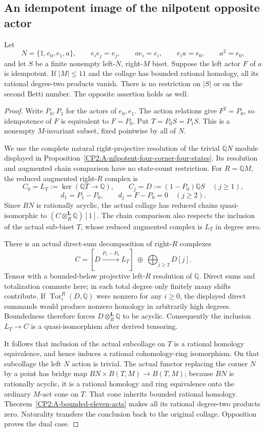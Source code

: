 \subsection{An idempotent image of the nilpotent opposite actor}

\begin{proposition}[Proved]
\label{CP2:A-nilpotent-four-idempotent-action}
Let
\[
 N=\{1,e_0,e_1,a\},\qquad
 e_i e_j=e_j,\qquad ae_i=e_i,\qquad e_i a=e_0,\qquad a^2=e_0,
\]
and let $S$ be a finite nonempty left-$N$, right-$M$ biset.  Suppose
the left actor $F$ of $a$ is idempotent.  If $|M|\leq11$ and the
collage has bounded rational homology, all its rational degree-two
products vanish.  There is no restriction on $|S|$ or on the second
Betti number.  The opposite assertion holds as well.
\end{proposition}
\begin{proof}
Write $P_0,P_1$ for the actors of $e_0,e_1$.  The action relations
give $F^2=P_0$, so idempotence of $F$ is equivalent to $F=P_0$.
Put $T=P_0S=P_1S$.  This is a nonempty $M$-invariant subset, fixed
pointwise by all of $N$.

We use the complete natural right-projective resolution of the
trivial $\mathbb QN$ module displayed in
Proposition~\ref{CP2:A-nilpotent-four-corner-four-states}.  Its
resolution and augmented chain comparison have no state-count
restriction.  For $R=\mathbb QM$, the reduced augmented right-$R$
complex is
\[
 C_0=L_T:=\ker(\mathbb QT\to\mathbb Q),\qquad
 C_j=D:=(1-P_0)\mathbb QS\quad(j\geq1),
\]
\[
 d_1=P_1-P_0,\qquad d_j=F-P_0=0\quad(j\geq2).
\]
Since $BN$ is rationally acyclic, the actual collage has reduced
chains quasi-isomorphic to
$(C\otimes_R^{\mathbf L}\mathbb Q)[1]$.  The chain comparison
also respects the inclusion of the actual sub-biset $T$, whose
reduced augmented complex is $L_T$ in degree zero.

There is an actual direct-sum decomposition of right-$R$ complexes
\[
 C=[D\xrightarrow{P_1-P_0}L_T]
       \ \oplus\ \bigoplus_{j\geq2}D[j].
\]
Tensor with a bounded-below projective left-$R$ resolution of
$\mathbb Q$.  Direct sums and totalization commute here; in each
total degree only finitely many shifts contribute.  If
$\operatorname{Tor}^R_i(D,\mathbb Q)$ were nonzero for any $i\geq0$,
the displayed direct summands would produce nonzero homology in
arbitrarily high degrees.  Boundedness therefore forces
$D\otimes_R^{\mathbf L}\mathbb Q$ to be acyclic.  Consequently
the inclusion $L_T\to C$ is a quasi-isomorphism after derived
tensoring.

It follows that inclusion of the actual subcollage on $T$ is a
rational homology equivalence, and hence induces a rational
cohomology-ring isomorphism.  On that subcollage the left $N$
action is trivial.  The actual functor replacing the corner $N$
by a point has bridge map
$BN\times B(T,M)\to B(T,M)$; because $BN$ is rationally acyclic,
it is a rational homology and ring equivalence onto the ordinary
$M$-act cone on $T$.  That cone inherits bounded rational homology.
Theorem~\ref{CP2:A-bounded-eleven-acts} makes all its rational
degree-two products zero.  Naturality transfers the conclusion
back to the original collage.  Opposition proves the dual case.
\end{proof}

